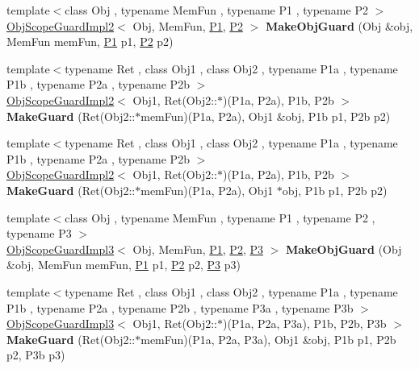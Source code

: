\begin{DoxyCompactItemize}
\item 
\hypertarget{namespaceLoki_ad719eadbea674353605be1958dfacf81}{}{\footnotesize template$<$class Obj , typename Mem\+Fun , typename P1 , typename P2 $>$ }\\\hyperlink{classLoki_1_1ObjScopeGuardImpl2}{Obj\+Scope\+Guard\+Impl2}$<$ Obj, Mem\+Fun, \hyperlink{structP1}{P1}, \hyperlink{structP2}{P2} $>$ {\bfseries Make\+Obj\+Guard} (Obj \&obj, Mem\+Fun mem\+Fun, \hyperlink{structP1}{P1} p1, \hyperlink{structP2}{P2} p2)\label{namespaceLoki_ad719eadbea674353605be1958dfacf81}

\item 
\hypertarget{namespaceLoki_a190ba405c52fe006d9e9932f04178811}{}{\footnotesize template$<$typename Ret , class Obj1 , class Obj2 , typename P1a , typename P1b , typename P2a , typename P2b $>$ }\\\hyperlink{classLoki_1_1ObjScopeGuardImpl2}{Obj\+Scope\+Guard\+Impl2}$<$ Obj1, Ret(Obj2\+::$\ast$)(P1a, P2a), P1b, P2b $>$ {\bfseries Make\+Guard} (Ret(Obj2\+::$\ast$mem\+Fun)(P1a, P2a), Obj1 \&obj, P1b p1, P2b p2)\label{namespaceLoki_a190ba405c52fe006d9e9932f04178811}

\item 
\hypertarget{namespaceLoki_ad896d06d6cc6cc6533adc92417c857c5}{}{\footnotesize template$<$typename Ret , class Obj1 , class Obj2 , typename P1a , typename P1b , typename P2a , typename P2b $>$ }\\\hyperlink{classLoki_1_1ObjScopeGuardImpl2}{Obj\+Scope\+Guard\+Impl2}$<$ Obj1, Ret(Obj2\+::$\ast$)(P1a, P2a), P1b, P2b $>$ {\bfseries Make\+Guard} (Ret(Obj2\+::$\ast$mem\+Fun)(P1a, P2a), Obj1 $\ast$obj, P1b p1, P2b p2)\label{namespaceLoki_ad896d06d6cc6cc6533adc92417c857c5}

\item 
\hypertarget{namespaceLoki_a07dd28ea84c5db36ce9047c7d9926945}{}{\footnotesize template$<$class Obj , typename Mem\+Fun , typename P1 , typename P2 , typename P3 $>$ }\\\hyperlink{classLoki_1_1ObjScopeGuardImpl3}{Obj\+Scope\+Guard\+Impl3}$<$ Obj, Mem\+Fun, \hyperlink{structP1}{P1}, \hyperlink{structP2}{P2}, \hyperlink{structP3}{P3} $>$ {\bfseries Make\+Obj\+Guard} (Obj \&obj, Mem\+Fun mem\+Fun, \hyperlink{structP1}{P1} p1, \hyperlink{structP2}{P2} p2, \hyperlink{structP3}{P3} p3)\label{namespaceLoki_a07dd28ea84c5db36ce9047c7d9926945}

\item 
\hypertarget{namespaceLoki_aa9f7adeaacce8081d3dbdc193704d5bb}{}{\footnotesize template$<$typename Ret , class Obj1 , class Obj2 , typename P1a , typename P1b , typename P2a , typename P2b , typename P3a , typename P3b $>$ }\\\hyperlink{classLoki_1_1ObjScopeGuardImpl3}{Obj\+Scope\+Guard\+Impl3}$<$ Obj1, Ret(Obj2\+::$\ast$)(P1a, P2a, P3a), P1b, P2b, P3b $>$ {\bfseries Make\+Guard} (Ret(Obj2\+::$\ast$mem\+Fun)(P1a, P2a, P3a), Obj1 \&obj, P1b p1, P2b p2, P3b p3)\label{namespaceLoki_aa9f7adeaacce8081d3dbdc193704d5bb}


\end{DoxyCompactItemize}

